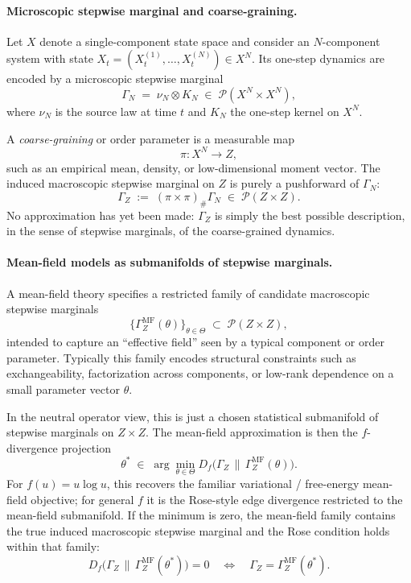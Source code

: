 \documentclass[11pt]{article}
\newcommand{\1}{\mathbf{1}}
\newcommand{\push}{\#}
\begin{document}
\paragraph{Microscopic stepwise marginal and coarse-graining.}
Let $X$ denote a single-component state space and consider an $N$-component system with state $X_t = (X_t^{(1)},\dots,X_t^{(N)}) \in X^N$. Its one-step dynamics are encoded by a microscopic stepwise marginal
\[
\Gamma_N \;=\; \nu_N \otimes K_N \;\in\; \mathcal P(X^N \times X^N),
\]
where $\nu_N$ is the source law at time $t$ and $K_N$ the one-step kernel on $X^N$.

A \emph{coarse-graining} or order parameter is a measurable map
\[
\pi \colon X^N \to Z,
\]
such as an empirical mean, density, or low-dimensional moment vector. The induced macroscopic stepwise marginal on $Z$ is purely a pushforward of $\Gamma_N$:
\[
\Gamma_Z \;:=\; (\pi \times \pi)_{\push} \Gamma_N \;\in\; \mathcal P(Z \times Z).
\]
No approximation has yet been made: $\Gamma_Z$ is simply the best possible description, in the sense of stepwise marginals, of the coarse-grained dynamics.

\paragraph{Mean-field models as submanifolds of stepwise marginals.}
A mean-field theory specifies a restricted family of candidate macroscopic stepwise marginals
\[
\big\{\Gamma_Z^{\mathrm{MF}}(\theta)\big\}_{\theta \in \Theta}
\;\subset\;
\mathcal P(Z\times Z),
\]
intended to capture an ``effective field'' seen by a typical component or order parameter. Typically this family encodes structural constraints such as exchangeability, factorization across components, or low-rank dependence on a small parameter vector $\theta$.

In the neutral operator view, this is just a chosen statistical submanifold of stepwise marginals on $Z\times Z$. The mean-field approximation is then the $f$-divergence projection
\[
\theta^\ast
\;\in\;
\arg\min_{\theta \in \Theta}
D_f\!\big(\Gamma_Z \,\big\|\, \Gamma_Z^{\mathrm{MF}}(\theta)\big).
\]
For $f(u)=u\log u$, this recovers the familiar variational / free-energy mean-field objective; for general $f$ it is the Rose-style edge divergence restricted to the mean-field submanifold. If the minimum is zero, the mean-field family contains the true induced macroscopic stepwise marginal and the Rose condition holds within that family:
\[
D_f\!\big(\Gamma_Z \,\big\|\, \Gamma_Z^{\mathrm{MF}}(\theta^\ast)\big)=0
\quad\Longleftrightarrow\quad
\Gamma_Z = \Gamma_Z^{\mathrm{MF}}(\theta^\ast).
\]
\end{document}
